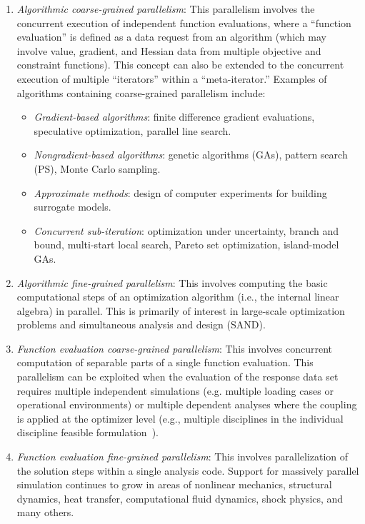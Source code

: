\begin{enumerate}
\item \emph{Algorithmic coarse-grained parallelism}: This parallelism
  involves the concurrent execution of independent function
  evaluations, where a ``function evaluation'' is defined as a data
  request from an algorithm (which may involve value, gradient, and
  Hessian data from multiple objective and constraint functions). This
  concept can also be extended to the concurrent execution of multiple
  ``iterators'' within a ``meta-iterator.'' Examples of algorithms
  containing coarse-grained parallelism include:
  \begin{itemize}
  \item \emph{Gradient-based algorithms}: finite difference gradient
    evaluations, speculative optimization, parallel line search.

  \item \emph{Nongradient-based algorithms}: genetic algorithms (GAs),
    pattern search (PS), Monte Carlo sampling.

  \item \emph{Approximate methods}: design of computer experiments for
    building surrogate models.

  \item \emph{Concurrent sub-iteration}: optimization under
    uncertainty, branch and bound, multi-start local search, Pareto
    set optimization, island-model GAs.
  \end{itemize}

\item \emph{Algorithmic fine-grained parallelism}: This involves
  computing the basic computational steps of an optimization algorithm
  (i.e., the internal linear algebra) in parallel. This is primarily
  of interest in large-scale optimization problems and simultaneous
  analysis and design (SAND).

\item \emph{Function evaluation coarse-grained parallelism}: This
  involves concurrent computation of separable parts of a single
  function evaluation. This parallelism can be exploited when the
  evaluation of the response data set requires multiple independent
  simulations (e.g. multiple loading cases or operational
  environments) or multiple dependent analyses where the coupling is
  applied at the optimizer level (e.g., multiple disciplines in the
  individual discipline feasible formulation~\cite{Den94a}).

\item \emph{Function evaluation fine-grained parallelism}: This
  involves parallelization of the solution steps within a single
  analysis code.  Support for massively parallel simulation continues
  to grow in areas of nonlinear mechanics, structural dynamics, heat
  transfer, computational fluid dynamics, shock physics, and many
  others.
\end{enumerate}

